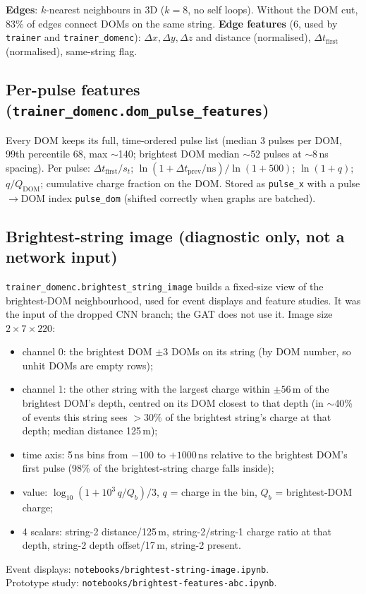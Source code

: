 \documentclass[11pt,a4paper]{article}
\newcommand{\code}[1]{\texttt{#1}}
\begin{document}
\medskip
\textbf{Edges}: $k$-nearest neighbours in 3D ($k=8$, no self loops). Without the DOM cut, 83\% of edges connect DOMs on
the same string. \textbf{Edge features} (6, used by \code{trainer} and \code{trainer\_domenc}):
$\Delta x,\Delta y,\Delta z$ and distance (normalised), $\Delta t_\mathrm{first}$ (normalised), same-string flag.

\subsection{Per-pulse features (\code{trainer\_domenc.dom\_pulse\_features})}
Every DOM keeps its full, time-ordered pulse list (median 3 pulses per DOM, 99th percentile 68, max $\sim$140;
brightest DOM median $\sim$52 pulses at $\sim$8\,ns spacing). Per pulse:
$\Delta t_\mathrm{first}/s_t$; $\ln(1+\Delta t_\mathrm{prev}/\mathrm{ns})/\ln(1+500)$; $\ln(1+q)$; $q/Q_\mathrm{DOM}$;
cumulative charge fraction on the DOM. Stored as \code{pulse\_x} with a pulse$\to$DOM index \code{pulse\_dom}
(shifted correctly when graphs are batched).

\subsection{Brightest-string image (diagnostic only, not a network input)}
\code{trainer\_domenc.brightest\_string\_image} builds a fixed-size view of the brightest-DOM neighbourhood, used for
event displays and feature studies. It was the input of the dropped CNN branch; the GAT does not use it.
Image size $2\times7\times220$:
\begin{itemize}
  \item channel 0: the brightest DOM $\pm3$ DOMs on its string (by DOM number, so unhit DOMs are empty rows);
  \item channel 1: the other string with the largest charge within $\pm56$\,m of the brightest DOM's depth, centred on
        its DOM closest to that depth (in $\sim$40\% of events this string sees $>30\%$ of the brightest string's charge
        at that depth; median distance 125\,m);
  \item time axis: 5\,ns bins from $-100$ to $+1000$\,ns relative to the brightest DOM's first pulse (98\% of the
        brightest-string charge falls inside);
  \item value: $\log_{10}(1+10^3\,q/Q_b)/3$, $q$ = charge in the bin, $Q_b$ = brightest-DOM charge;
  \item 4 scalars: string-2 distance/125\,m, string-2/string-1 charge ratio at that depth, string-2 depth offset/17\,m,
        string-2 present.
\end{itemize}
Event displays: \code{notebooks/brightest-string-image.ipynb}.\\
Prototype study: \code{notebooks/brightest-features-abc.ipynb}.
\end{document}
